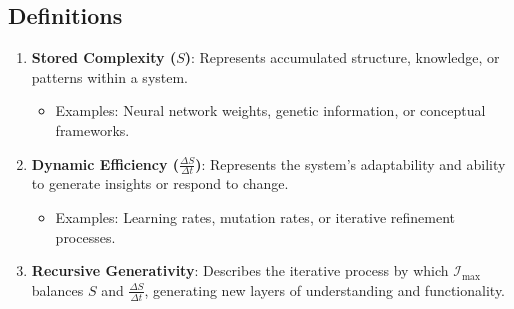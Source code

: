 \documentclass[12pt]{article}
\begin{document}
\subsection{Definitions}
\begin{enumerate}
    \item \textbf{Stored Complexity (\(S\))}: Represents accumulated structure, knowledge, or patterns within a system.
        \begin{itemize}
            \item Examples: Neural network weights, genetic information, or conceptual frameworks.
        \end{itemize}
    \item \textbf{Dynamic Efficiency (\(\frac{\Delta S}{\Delta t}\))}: Represents the system’s adaptability and ability to generate insights or respond to change.
        \begin{itemize}
            \item Examples: Learning rates, mutation rates, or iterative refinement processes.
        \end{itemize}
    \item \textbf{Recursive Generativity}: Describes the iterative process by which \(\mathcal{I}_{\text{max}}\) balances \(S\) and \(\frac{\Delta S}{\Delta t}\), generating new layers of understanding and functionality.
\end{enumerate}
\end{document}
